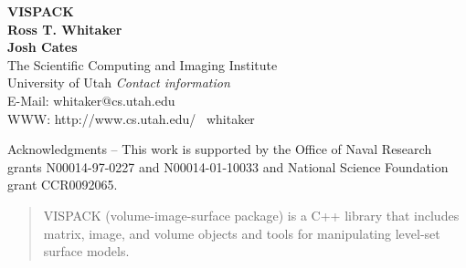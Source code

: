 \renewcommand{\floatpagefraction}{0.7}

\newcommand{\mv}[1]{{\boldmath #1}}
\newcommand{\code}[1]{\texttt{#1}}
\newcommand{\Asymbol}[1]{\mathit{\mathbf{#1}}}



\pssilent
\psdraftbox

\setlength{\textwidth}{6.5in}
\setlength{\textheight}{8.75in}
\setlength{\topmargin}{-0.5in}
\setlength{\parindent}{0.0in}

\setlength{\oddsidemargin}{0.0in}
\setlength{\evensidemargin}{0.0in}

\setlength{\footheight}{10pt}
\setlength{\footskip}{0.5in}

\setlength{\baselineskip}{14pt}

\vspace*{2.0in}

\begin{centering}

{\huge {\bf VISPACK}}\\

\vspace*{0.1in}
{\bf Ross T. Whitaker}\\
\vspace*{0.1in}
{\bf Josh Cates}\\
\vspace*{0.25in}
The Scientific Computing and Imaging Institute \\
University of Utah 
\vspace*{2.0in}
{\em Contact information}\\
  E-Mail: whitaker@cs.utah.edu\\
  WWW: http://www.cs.utah.edu/~{ }whitaker\\
\end{centering}
\vspace*{0.5in}
Acknowledgments -- This work is supported by  the Office of Naval Research grants
N00014-97-0227 and N00014-01-10033 and National Science Foundation
grant CCR0092065.
\thispagestyle{empty}


\setlength{\parskip}{0.1666in}

\clearpage
\begin{abstract}
VISPACK (volume-image-surface package) 
is a C++ library that includes matrix, image, and volume 
objects and tools for manipulating level-set surface models.  
\end{abstract}

\clearpage
\tableofcontents
\clearpage

